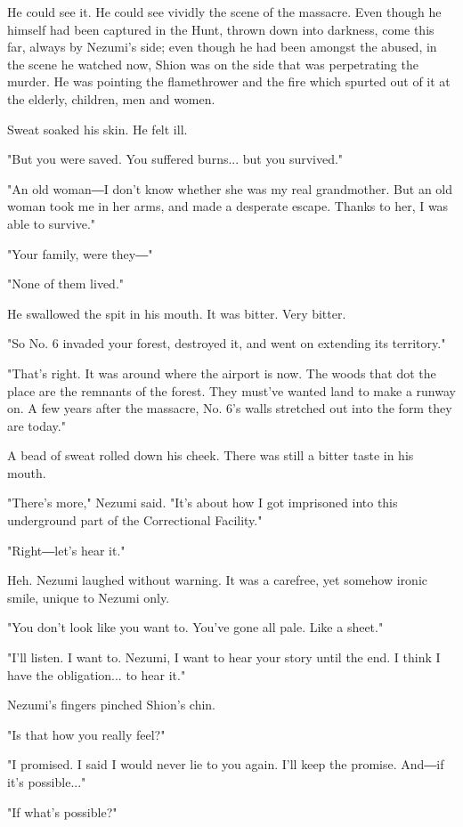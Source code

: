 He could see it. He could see vividly the scene of the massacre. Even
though he himself had been captured in the Hunt, thrown down into
darkness, come this far, always by Nezumi's side; even though he had
been amongst the abused, in the scene he watched now, Shion was on the
side that was perpetrating the murder. He was pointing the flamethrower
and the fire which spurted out of it at the elderly, children, men and
women.

Sweat soaked his skin. He felt ill.

"But you were saved. You suffered burns... but you survived."

"An old woman―I don't know whether she was my real grandmother. But an
old woman took me in her arms, and made a desperate escape. Thanks to
her, I was able to survive."

"Your family, were they―"

"None of them lived."

He swallowed the spit in his mouth. It was bitter. Very bitter.

"So No. 6 invaded your forest, destroyed it, and went on extending its
territory."

"That's right. It was around where the airport is now. The woods that
dot the place are the remnants of the forest. They must've wanted land
to make a runway on. A few years after the massacre, No. 6's walls
stretched out into the form they are today."

A bead of sweat rolled down his cheek. There was still a bitter taste in
his mouth.

"There's more," Nezumi said. "It's about how I got imprisoned into this
underground part of the Correctional Facility."

"Right―let's hear it."

Heh. Nezumi laughed without warning. It was a carefree, yet somehow
ironic smile, unique to Nezumi only.

"You don't look like you want to. You've gone all pale. Like a sheet."

"I'll listen. I want to. Nezumi, I want to hear your story until the
end. I think I have the obligation... to hear it."

Nezumi's fingers pinched Shion's chin.

"Is that how you really feel?"

"I promised. I said I would never lie to you again. I'll keep the
promise. And―if it's possible..."

"If what's possible?"

